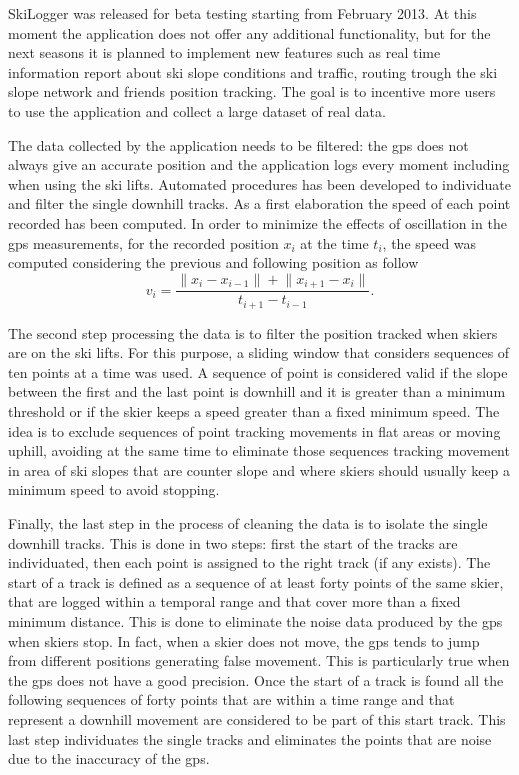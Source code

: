 \documentclass[12pt,a4paper,twoside]{book}
\newcommand{\norm}[1]{\lVert#1\rVert}
\begin{document}
SkiLogger was released for beta testing starting from February 2013. At this moment the application does not offer any additional functionality, but for the next seasons it is planned to implement new features such as real time information report about ski slope conditions and traffic, routing trough the ski slope network and friends position tracking. The goal is to incentive more users to use the application and collect a large dataset of real data.

The data collected by the application needs to be filtered: the gps does not always give an accurate position and the application logs every moment including when using the ski lifts. Automated procedures has been developed to individuate and filter the single downhill tracks. As a first elaboration the speed of each point recorded has been computed. In order to minimize the effects of oscillation in the gps measurements, for the recorded position $x_i$ at the time $t_i$, the speed was computed considering the previous and following position as follow
\begin{equation}
v_i=\frac{\norm{x_i-x_{i-1}}+\norm{x_{i+1}-x_i}}{t_{i+1}-t_{i-1}}.
\end{equation}

The second step processing the data is to filter the position tracked when skiers are on the ski lifts. For this purpose, a sliding window that considers sequences of ten points at a time was used. A sequence of point is considered valid if the slope between the first and the last point is downhill and it is greater than a minimum threshold or if the skier keeps a speed greater than a fixed minimum speed. The idea is to exclude sequences of point tracking movements in flat areas or moving uphill, avoiding at the same time to eliminate those sequences tracking movement in area of ski slopes that are counter slope and where skiers should usually keep a minimum speed to avoid stopping.

Finally, the last step in the process of cleaning the data is to isolate the single downhill tracks. This is done in two steps: first the start of the tracks are individuated, then each point is assigned to the right track (if any exists). The start of a track is defined as a sequence of at least forty points of the same skier, that are logged within a temporal range and that cover more than a fixed minimum distance. This is done to eliminate the noise data produced by the gps when skiers stop. In fact, when a skier does not move, the gps tends to jump from different positions generating false movement. This is particularly true when the gps does not have a good precision. Once the start of a track is found all the following sequences of forty points that are within a time range and that represent a downhill movement are considered to be part of this start track. This last step individuates the single tracks and eliminates the points that are noise due to the inaccuracy of the gps.
\end{document}
